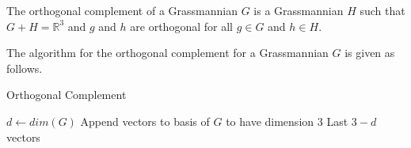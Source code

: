 \documentclass[12pt]{article}
\newcommand{\R}{\mathbb{R}}
\newenvironment{definition}[2][Definition]{\begin{trivlist}
\item[\hskip \labelsep {\bfseries #1}\hskip \labelsep {\bfseries #2.}]}{\end{trivlist}}
\newenvironment{proposition}[2][Proposition]{\begin{trivlist}
\item[\hskip \labelsep {\bfseries #1}\hskip \labelsep {\bfseries #2.}]}{\end{trivlist}}
\begin{document}
\begin{definition}{4.1}
The orthogonal complement of a Grassmannian \(G\) is a Grassmannian \(H\) such that \(G + H = \R^3\) and \(g\) and \(h\) are orthogonal for all \(g \in G\) and \(h \in H\).
\end{definition}

\begin{proposition}{4.2}
The algorithm for the orthogonal complement for a Grassmannian \(G\) is given as follows.

\begin{algorithm}[H]
\caption{Orthogonal Complement}
\begin{algorithmic}[5]
\State $d \gets dim(G)$
\State Append vectors to basis of $G$ to have dimension 3
\Return Last $3-d$ vectors
\EndProcedure
\end{algorithmic}
\end{algorithm}

\end{proposition}



\end{document}
